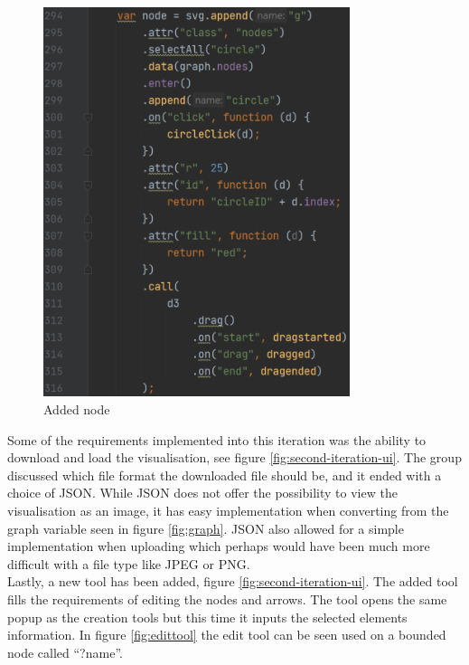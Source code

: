 \begin{figure}[H]
    \centering
    \includegraphics[width=0.8\textwidth]{figures/added-node.pdf}
    \caption{Added node}
    \label{fig:addednode}
\end{figure}

Some of the requirements implemented into this iteration was the ability to download and load the visualisation, see figure \ref{fig:second-iteration-ui}. The group discussed which file format the downloaded file should be, and it ended with a choice of JSON. While JSON does not offer the possibility to view the visualisation as an image, it has easy implementation when converting from the graph variable seen in figure \ref{fig:graph}. JSON also allowed for a simple implementation when uploading which perhaps would have been much more difficult with a file type like JPEG or PNG.
\\
Lastly, a new tool has been added, figure \ref{fig:second-iteration-ui}. The added tool fills the requirements of editing the nodes and arrows. The tool opens the same popup as the creation tools but this time it inputs the selected elements information. In figure \ref{fig:edittool} the edit tool can be seen used on a bounded node called “?name”.

